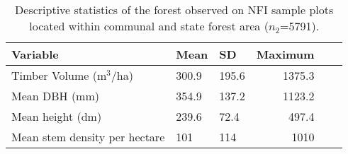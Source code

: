 
\begin{table}[ht]
	\begin{center}
	\caption{Descriptive statistics of the forest observed on NFI sample plots located within communal and state forest area ($n_2$=5791).}
	\label{tab:fieldata}
	{\small %
	\begin{tabular}{lllrrr}
		\hline
		Variable & Mean & SD & Maximum \\ 
		\hline \hline
Timber Volume (m$^3$/ha) & 300.9 & 195.6 & 1375.3 \\
Mean DBH (mm) & 354.9 & 137.2 & 1123.2 \\
Mean height (dm) & 239.6 & 72.4 & 497.4 \\
Mean stem density per hectare & 101  & 114 & 1010 \\
\hline
\hline
\end{tabular}
}%
\end{center}
\end{table}

